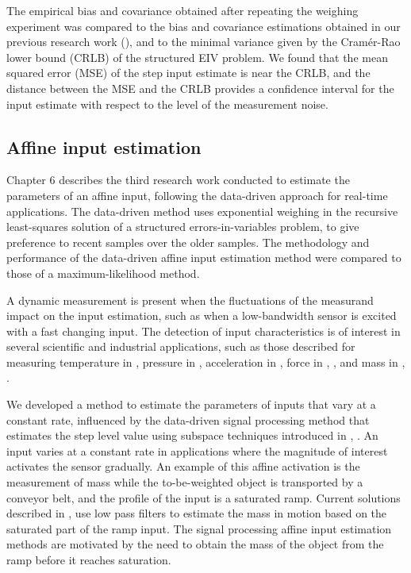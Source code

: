 The empirical bias and covariance obtained after repeating the weighing experiment was compared to the bias and covariance estimations obtained in our previous research work (\citet{QuintanaCSDA}), and to the minimal variance given by the  Cram\'er-Rao lower bound (CRLB) of the structured EIV problem.
We found that the mean squared error (MSE) of the step input estimate is near the CRLB, and the distance between the MSE and the CRLB provides a confidence interval for the input estimate with respect to the level of the measurement noise. 

 
\subsection{Affine input estimation}

\color{blue}Chapter 6 describes \color{black} the third research work conducted to estimate the parameters of an affine input, following the data-driven approach for real-time applications. 
The data-driven method uses exponential weighing in the recursive least-squares solution of a structured errors-in-variables problem, to give preference to recent samples over the older samples.
The methodology and performance of the data-driven affine input estimation method were compared to those of a maximum-likelihood method.

A dynamic measurement is present when the fluctuations of the measurand impact on the input estimation, such as when a low-bandwidth sensor is excited with a fast changing input.
The detection of input characteristics is of interest in several scientific and industrial applications, such as those described for measuring temperature in \citet{Saggin01}, pressure in \citet{Matthews14}, acceleration in \citet{Link07}, force in \citet{Vlajic16}, \citet{Hessling08a}, and mass in \citet{Shu93}, \citet{Boschetti13}.

We developed a method to estimate the parameters of inputs that vary at a constant rate, influenced by the data-driven signal processing method that estimates the step level value using subspace techniques introduced in \citet{Markovsky15cep}, \citet{Markovsky15ieee}.
An input varies at a constant rate in applications where the magnitude of interest activates the sensor gradually. 
An example of this affine activation is the measurement of mass while the to-be-weighted object is transported by a conveyor belt, and the profile of the input is a saturated ramp.
Current solutions described in \citet{Tasaki07}, \citet{Pietrzak14} use low pass filters to estimate the mass in motion based on the saturated part of the ramp input.
The signal processing affine input estimation methods are motivated by the need to obtain the mass of the object from the ramp before it reaches saturation.

